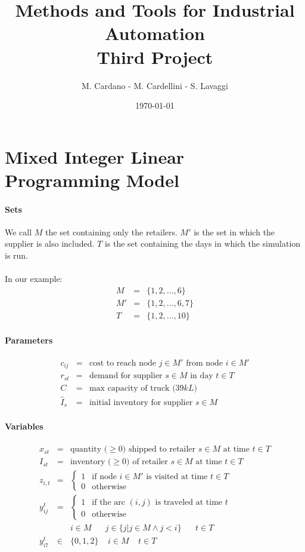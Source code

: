 \documentclass{article}
\title{Methods and Tools for Industrial Automation \\ Third Project}
\author{M. Cardano - M. Cardellini - S. Lavaggi}
\date{\today}
\begin{document}
\maketitle


\section{Mixed Integer Linear Programming Model}
\paragraph{Sets}
We call $M$ the set containing only the retailers. $M'$ is the set in which the supplier is also included. $T$ is the set containing the days in which the simulation is run. \\\\
In our example:
\begin{eqnarray*}
M &=& \{1,2, \dots, 6\} \\
M' &=& \{1,2,  \dots, 6, 7\} \\
T &=& \{1,2, \dots, 10\} 	
\end{eqnarray*}

\paragraph{Parameters}
\begin{eqnarray*}
	c_{ij} &=& \text{cost to reach node $j \in M'$ from node $i \in M'$} \\
	r_{st} &=& \text{demand for supplier $s \in M$ in day $t \in T$} \\
	C & = & \text{max capacity of truck ($39kL$)}\\
	\hat{I}_s & = & \text{initial inventory for supplier $s \in M$}
\end{eqnarray*}

\paragraph{Variables}
\begin{eqnarray*}
	x_{st} &=& \text{quantity ($\geq 0$) shipped to retailer $s \in M$ at time $t \in T$}\\
	I_{st} &=& \text{inventory ($\geq 0$) of retailer $s \in M$ at time $t \in T$}\\
	z_{i,t} & = & 
	\begin{cases}
		1 & \text{if node $i \in M'$ is visited at time $t \in T$} \\
		0 & \text{otherwise}
	\end{cases} \\
	y_{ij}^t & = & \begin{cases}
		1 & \text{if the arc $(i,j)$ is traveled at time $t$} \\
		0 & \text{otherwise}
	\end{cases} \\
	&& i \in M \;\;\;\;\;\; j \in \{j \vert j \in M \wedge j <i \} \;\;\;\;\;\; t \in T
	\\
	y_{i7}^t & \in & \{0,1,2\} \;\;\;\; i \in M \;\;\;\; t \in T
\end{eqnarray*}
\end{document}
